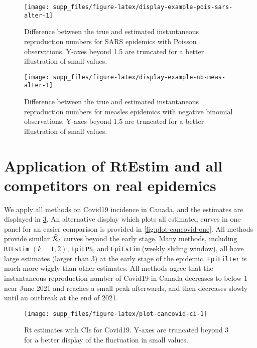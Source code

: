 \documentclass[
]{article}
\begin{document}
\begin{figure}[!ht]

{\centering \texttt{[image: supp\_files/figure-latex/display-example-pois-sars-alter-1]} 

}

\caption{Difference between the true and estimated instantaneous reproduction numbers for SARS epidemics with Poisson observations. Y-axes beyond 1.5 are truncated for a better illustration of small values.}\label{fig:display-example-pois-sars-alter}
\end{figure}

\begin{figure}[!ht]

{\centering \texttt{[image: supp\_files/figure-latex/display-example-nb-meas-alter-1]} 

}

\caption{Difference between the true and estimated instantaneous reproduction numbers for measles epidemics with negative binomial observations. Y-axes beyond 1.5 are truncated for a better illustration of small values.}\label{fig:display-example-nb-meas-alter}
\end{figure}

\clearpage

\section{Application of RtEstim and all competitors on real epidemics}\label{application-of-rtestim-and-all-competitors-on-real-epidemics}

We apply all methods on Covid19 incidence in Canada, and the estimates are displayed
in \ref{fig:plot-cancovid-ci}. An alternative display which plots all estimated
curves in one panel for an easier comparison is provided in
\ref{fig:plot-cancovid-one}. All methods provide similar \(\widehat{\mathcal{R}}_t\) curves
beyond the early stage. Many methods, including \texttt{RtEstim} \((k=1,2)\), \texttt{EpiLPS}, and
\texttt{EpiEstim} (weekly sliding window), all have large estimates (larger than 3) at
the early stage of the epidemic. \texttt{EpiFilter} is much more wiggly than other estimates.
All methods agree that the instantaneous reproduction number
of Covid19 in Canada decreases to below 1 near June 2021 and reaches a small peak
afterwards, and then decreases slowly until an outbreak at the end of 2021.

\begin{figure}[!ht]

{\centering \texttt{[image: supp\_files/figure-latex/plot-cancovid-ci-1]} 

}

\caption{Rt estimates with CIs for Covid19. Y-axes are truncated beyond 3 for a better display of the fluctuation in small values.}\label{fig:plot-cancovid-ci}
\end{figure}
\end{document}
